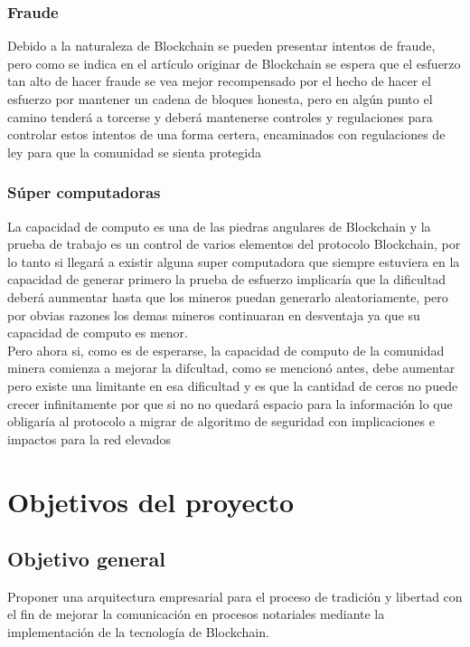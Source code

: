 \subsubsection{Fraude}
Debido a la naturaleza de Blockchain se pueden presentar intentos de fraude, pero como se indica en el artículo originar de Blockchain se espera que el esfuerzo tan alto de hacer fraude se vea mejor recompensado por el hecho de hacer el esfuerzo por mantener un cadena de bloques honesta\citep{nakamoto2009bitcoin}, pero en algún punto el camino tenderá a torcerse y deberá mantenerse controles y regulaciones para controlar estos intentos de una forma certera, encaminados con regulaciones de ley para que la comunidad se sienta protegida

\subsubsection{Súper computadoras}
La capacidad de computo es una de las piedras angulares de Blockchain y la prueba de trabajo es un control de varios elementos del protocolo Blockchain, por lo tanto si llegará a existir alguna super computadora que siempre estuviera en la capacidad de generar primero la prueba de esfuerzo implicaría que la dificultad \citep{nakamoto2009bitcoin} deberá aunmentar hasta que los mineros puedan generarlo aleatoriamente, pero por obvias razones los demas mineros continuaran en desventaja ya que su capacidad de computo es menor.
\\
Pero ahora si, como es de esperarse, la capacidad de computo de la comunidad minera comienza a mejorar la difcultad, como se mencionó antes, debe aumentar pero existe una limitante en esa dificultad y es que la cantidad de ceros no puede crecer infinitamente por que si no no quedará espacio para la información lo que obligaría al protocolo a migrar de algoritmo de seguridad con implicaciones e impactos para la red elevados\citep{crosby2016blockchain}


\section{Objetivos del proyecto}

\subsection{Objetivo general}
Proponer una arquitectura empresarial para el proceso de tradición y libertad con el fin de mejorar la comunicación en procesos notariales mediante la implementación de la tecnología de Blockchain. 

